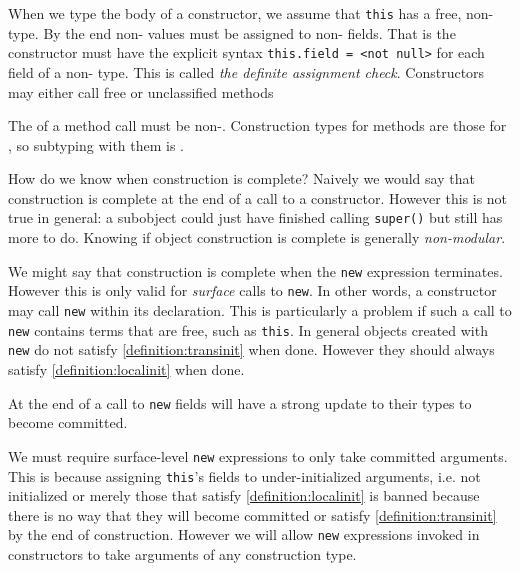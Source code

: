 \documentclass{article}
\begin{document}
\begin{definition}
  When we type the body of a constructor, we assume that \texttt{this} has a free, non-\cringe{} type.
  By the end non-\cringe{} values must be assigned to non-\cringe{} fields.
  That is the constructor must have the explicit syntax \texttt{this.field = <not null>} for each field of a non-\cringe{} type.
  This is called \textit{the definite assignment check}.
  Constructors may either call free or unclassified methods
\end{definition}

\begin{definition}
  The \receiver{} of a method call must be non-\cringe{}.
  Construction types for methods are those for \receiver{}, so subtyping with them is \contra{}.
\end{definition}

How do we know when construction is complete?
Naively we would say that construction is complete at the end of a call to a constructor.
However this is not true in general: a subobject could just have finished calling \texttt{super()} but still has more to do.
Knowing if object construction is complete is generally \textit{non-modular}.

We might say that construction is complete when the \texttt{new} expression terminates.
However this is only valid for \textit{surface} calls to \texttt{new}.
In other words, a constructor may call \texttt{new} within its declaration.
This is particularly a problem if such a call to \texttt{new} contains terms that are free, such as \texttt{this}.
In general objects created with \texttt{new} do not satisfy \ref{definition:transinit} when done.
However they should always satisfy \ref{definition:localinit} when done.

\begin{remark}\label{remark:constrstrongupdate}
  At the end of a call to \texttt{new} fields will have a strong update to their types to become committed.
\end{remark}

We must require surface-level \texttt{new} expressions to only take committed arguments.
This is because assigning \texttt{this}'s fields to under-initialized arguments, i.e. not initialized or merely those that satisfy \ref{definition:localinit} is banned because there is no way that they will become committed or satisfy \ref{definition:transinit} by the end of construction.
However we will allow \texttt{new} expressions invoked in constructors to take arguments of any construction type.
\end{document}
